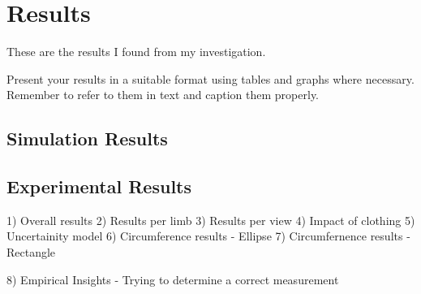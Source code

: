 \chapter{Results}
These are the results I found from my investigation.

Present your results in a suitable format using tables and graphs where necessary. Remember to refer
to them in text and caption them properly.


\section{Simulation Results}


\section{Experimental Results}

1) Overall results
2) Results per limb
3) Results per view
4) Impact of clothing
5) Uncertainity model
6) Circumference results - Ellipse
7) Circumfernence results - Rectangle

8) Empirical Insights - Trying to determine a correct measurement
